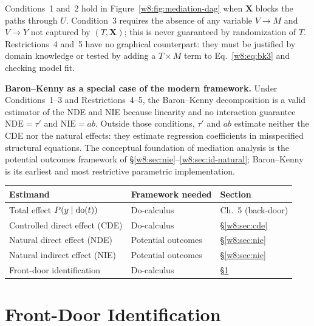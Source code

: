 \documentclass[master.tex]{subfiles}
\begin{document}
\noindent Conditions~1 and~2 hold in Figure~\ref{w8:fig:mediation-dag}
when $\mathbf{X}$ blocks the paths through $U$.  Condition~3 requires
the absence of any variable $V \to M$ and $V \to Y$ not captured by
$(T, \mathbf{X})$; this is never guaranteed by randomization of $T$.
Restrictions~4 and~5 have no graphical counterpart: they must be
justified by domain knowledge or tested by adding a $T \times M$ term
to Eq.~\eqref{w8:eq:bk3} and checking model fit.

\medskip\noindent\textbf{Baron--Kenny as a special case of the modern
framework.}  Under Conditions~1--3 and Restrictions~4--5, the
Baron--Kenny decomposition is a valid estimator of the NDE and NIE
because linearity and no interaction guarantee $\mathrm{NDE} = \tau'$
and $\mathrm{NIE} = ab$.
Outside those conditions, $\tau'$ and $ab$ estimate neither the CDE nor
the natural effects: they estimate regression coefficients in
misspecified structural equations.  The conceptual foundation of
mediation analysis is the potential outcomes framework of
§\ref{w8:sec:nie}--\ref{w8:sec:id-natural}; Baron--Kenny is its
earliest and most restrictive parametric implementation.

\begin{tcolorbox}[defstyle, title={Framework Map}]
\begin{center}
\renewcommand{\arraystretch}{1.4}
\begin{tabular}{@{}p{5.0cm}ll@{}}
\toprule
\textbf{Estimand} & \textbf{Framework needed} & \textbf{Section} \\
\midrule
Total effect $P(y \mid \mathrm{do}(t))$
  & Do-calculus   & Ch.~5 (back-door) \\
Controlled direct effect (CDE)
  & Do-calculus   & \S\ref{w8:sec:cde} \\
Natural direct effect (NDE)
  & Potential outcomes & \S\ref{w8:sec:nie} \\
Natural indirect effect (NIE)
  & Potential outcomes & \S\ref{w8:sec:nie} \\
Front-door identification
  & Do-calculus   & \S\ref{w8:sec:frontdoor} \\
\bottomrule
\end{tabular}
\end{center}
\end{tcolorbox}

\section{Front-Door Identification}
\label{w8:sec:frontdoor}
\end{document}
